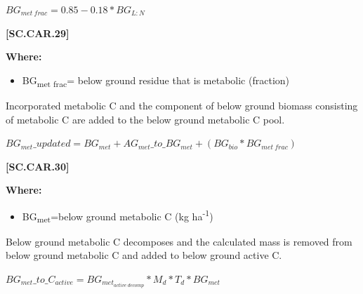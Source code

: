     \begin{center}
\(BG_{met\ frac}=0.85-0.18 * BG_{L:N}	\)
    \end{center}
        \vspace{0.5cm} 
    
            {\raggedleft \textbf{[SC.CAR.29]}\par}
            \vspace{0.5cm}

        \textbf{Where:}
            
        \begin{itemize}
            \item BG\textsubscript{met frac}=	below ground residue that is metabolic (fraction)
        \end{itemize}
        \vspace{0.5cm}

Incorporated metabolic C and the component of below ground biomass consisting of metabolic C are added to the below ground metabolic C pool.
        \vspace{0.5cm}

    \begin{center}
\(BG_{met}\_updated=BG_{met} + AG_{met}\_to\_BG_{met}+(BG_{bio} * BG_{met\ frac})\)
    \end{center}
        \vspace{0.5cm} 
    
            {\raggedleft \textbf{[SC.CAR.30]}\par}
            \vspace{0.5cm}

        \textbf{Where:}
            
        \begin{itemize}
            \item BG\textsubscript{met}=below ground metabolic C (kg ha\textsuperscript{-1})
        \end{itemize}
        \vspace{0.5cm}

Below ground metabolic C decomposes and the calculated mass is removed from below ground metabolic C and added to below ground active C.
        \vspace{0.5cm}

    \begin{center}
\(BG_{met}\_to\_C_{active}=BG_{met_{active\ decomp}} * M_d * T_d * BG_{met}\)
    \end{center}
        \vspace{0.5cm} 
    
